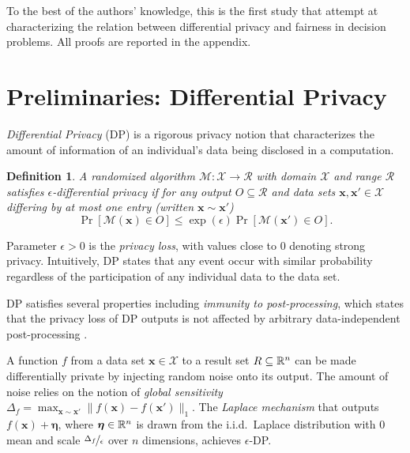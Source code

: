 \documentclass[9pt,twocolumn,twoside,lineno]{pnas-new}
\newtheorem{definition}{Definition}
\newcommand{\cM}{\mathcal{M}}
\newcommand{\cR}{\mathcal{R}}
\newcommand{\cX}{\mathcal{X}}
\begin{document}
To the best of the authors' knowledge, this is the first study that
attempt at characterizing the relation between differential privacy
and fairness in decision problems. All proofs are reported in the
appendix.


\section*{Preliminaries: Differential Privacy}

\emph{Differential Privacy} \cite{Dwork:06} (DP) is a rigorous privacy notion that characterizes the amount of information of an individual's data being disclosed in a computation.


\begin{definition}%
  A randomized algorithm $\cM:\cX \to \cR$ with domain $\cX$ and range $\cR$ satisfies $\epsilon$-\emph{differential privacy} if
  for any output $O \subseteq \cR$ and data sets $\bm{x}, \bm{x}' \in \cX$ differing by at most one entry (written $\bm{x} \sim \bm{x}'$) 
  \begin{equation}
  \label{eq:dp}
    \Pr[\cM(\bm{x}) \in O] \leq \exp(\epsilon) \Pr[\cM(\bm{x}') \in O]. 
  \end{equation}
\end{definition}

\noindent 
Parameter $\epsilon \!>\! 0$ is the \emph{privacy loss}, with values close 
to $0$ denoting strong privacy. Intuitively, DP states that 
any event occur with similar probability regardless of the participation
of any individual data to the data set. 

DP satisfies several properties including 
\emph{immunity to post-processing}, which states that the privacy 
loss of DP outputs is not affected by arbitrary data-independent 
post-processing \cite{Dwork:13}.

A function $f$ from a data set $\bm{x} \in \cX$ to a result set 
$R \subseteq \mathbb{R}^n$ can be made differentially private by injecting 
random noise onto its output. The amount of noise relies on the notion 
of \emph{global sensitivity} %
\(
\Delta_f = \max_{\bm{x} \sim \bm{x}'} \| f(\bm{x}) - f(\bm{x}') \|_1.
\)
The \emph{Laplace mechanism} \cite{Dwork:06} that outputs $f(\bm{x}) + \bm{\eta}$, where $\bm{\eta} \in \mathbb{R}^n$ is drawn from the i.i.d.~Laplace distribution with $0$ mean and scale  $\nicefrac{\Delta_f}{\epsilon}$ over $n$ dimensions, achieves $\epsilon$-DP.
\end{document}
